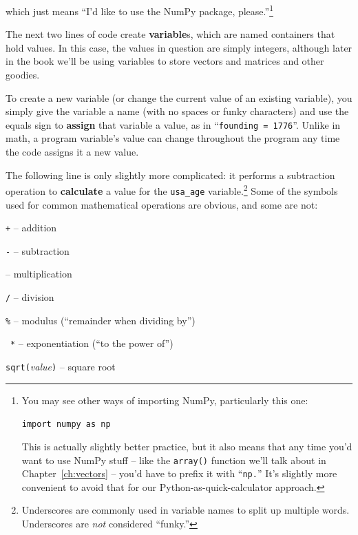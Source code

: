 which just means ``I'd like to use the NumPy package, please.''\footnote{You
may see other ways of importing NumPy, particularly this one:

\medskip
\quad\quad\texttt{import numpy as np}
\medskip

This is actually slightly better practice, but it also means that any time
you'd want to use NumPy stuff -- like the \texttt{array()} function we'll talk
about in Chapter~\ref{ch:vectors} -- you'd have to prefix it with
``\texttt{np.}'' It's slightly more convenient to avoid that for our
Python-as-quick-calculator approach.}

\smallskip


The next two lines of code create \textbf{variable}s, which are named
containers that hold values. In this case, the values in question are simply
integers, although later in the book we'll be using variables to store vectors
and matrices and other goodies.

To create a new variable (or change the current value of an existing variable),
you simply give the variable a name (with no spaces or funky characters) and
use the equals sign to \textbf{assign} that variable a value, as in
``\texttt{founding = 1776}''. Unlike in math, a program variable's value can
change throughout the program any time the code assigns it a new value.

The following line is only slightly more complicated: it performs a subtraction
operation to \textbf{calculate} a value for the \texttt{usa\_age}
variable.\footnote{Underscores are commonly used in variable names to split up
multiple words. Underscores are \textit{not} considered ``funky.''} Some of the
symbols used for common mathematical operations are obvious, and some are not:

\begin{compactitem}
\item[\quad\quad\quad\quad\quad \texttt{\large +}]-- addition
\item[\quad\quad\quad\quad\quad \texttt{\large -}]-- subtraction
\item[\quad\quad\quad\quad\quad \texttt{\large *}]-- multiplication
\item[\quad\quad\quad\quad\quad \texttt{\large /}]-- division
\item[\quad\quad\quad\quad\quad \texttt{\large \%}]-- modulus (``remainder when dividing by'')
\item[\quad\quad\quad\quad\ \texttt{\large **}]-- exponentiation (``to the power of'')
\item[\texttt{sqrt(}\textsl{value}\texttt{)}]-- square root
\end{compactitem}

